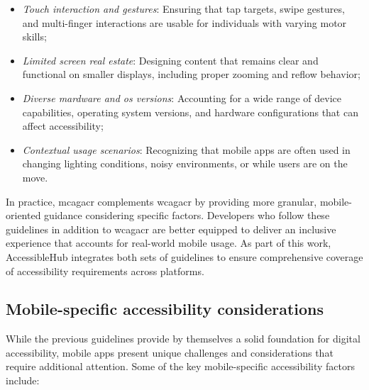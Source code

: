 \begin{itemize}
    \item \textit{Touch interaction and gestures}: Ensuring that tap targets, swipe gestures, and multi-finger interactions are usable for individuals with varying motor skills;
    
    \item \textit{Limited screen real estate}: Designing content that remains clear and functional on smaller displays, including proper zooming and reflow behavior;

    \item \textit{Diverse mardware and os versions}: Accounting for a wide range of device capabilities, operating system versions, and hardware configurations that can affect accessibility;

    \item \textit{Contextual usage scenarios}: Recognizing that mobile apps are often used in changing lighting conditions, noisy environments, or while users are on the move.
    
\end{itemize}

In practice, \acrshort{mcagacr} complements \acrshort{wcagacr} by providing more granular, mobile-oriented guidance considering specific factors. Developers who follow these guidelines in addition to \acrshort{wcagacr} are better equipped to deliver an inclusive experience that accounts for real-world mobile usage. As part of this work, AccessibleHub integrates both sets of guidelines to ensure comprehensive coverage of accessibility requirements across platforms.

\subsection{Mobile-specific accessibility considerations}

While the previous guidelines provide by themselves a solid foundation for digital accessibility, mobile apps present unique challenges and considerations that require additional attention. Some of the key mobile-specific accessibility factors include:

